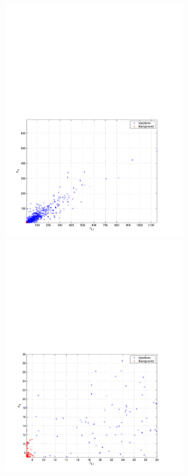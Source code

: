 \begin{figure}[p]
\begin{center}
\includegraphics[width=0.7\textwidth]{figures/result/bkg_inj}\\
\includegraphics[width=0.7\textwidth]{figures/result/bkg_inj_zoom}
\end{center}
\caption[Comparison of Background Triggers and Injections]{%
}
\end{figure}

